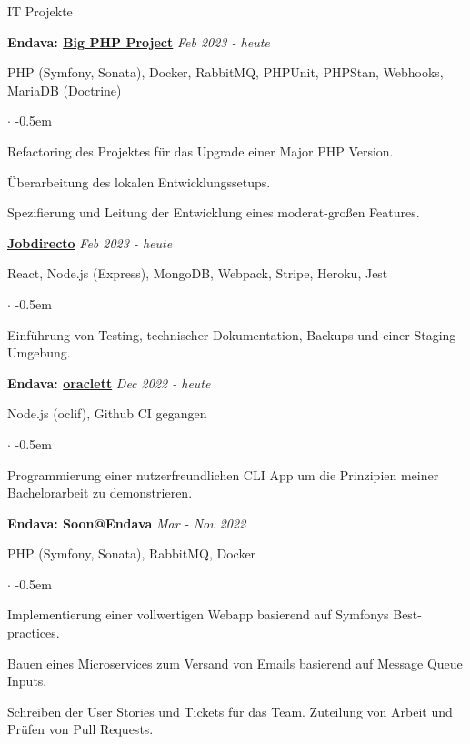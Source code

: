\documentclass{cv}
\begin{document}
\begin{rSection}{IT Projekte}



  \textbf{Endava: \href{https://tvthek.orf.at/}{Big PHP Project}}
  \hfill
  {\em Feb 2023 - heute}

  PHP (Symfony, Sonata), Docker, RabbitMQ, PHPUnit, PHPStan, Webhooks, MariaDB (Doctrine)
  \begin{list}{$\cdot$}{}
  \itemsep -0.5em \vspace{-0.5em}
    \smallskip
  \item Refactoring des Projektes für das Upgrade einer Major PHP Version.
  \item Überarbeitung des lokalen Entwicklungssetups.
  \item Spezifierung und Leitung der Entwicklung eines moderat-großen Features.
  \end{list}

  \textbf{\href{https://www.jobdirecto.com/}{Jobdirecto}}
  \hfill
  {\em Feb 2023 - heute}

  React, Node.js (Express), MongoDB, Webpack, Stripe, Heroku, Jest
  \begin{list}{$\cdot$}{}
  \itemsep -0.5em \vspace{-0.5em}
    \smallskip
  \item Einführung von Testing, technischer Dokumentation, Backups und einer Staging Umgebung.
  \end{list}

  \textbf{Endava: \href{https://github.com/jneidel/oraclett}{oraclett}}
  \hfill
  {\em Dec 2022 - heute}

  Node.js (oclif), Github CI
  gegangen  \begin{list}{$\cdot$}{}
  \itemsep -0.5em \vspace{-0.5em}
    \smallskip
  \item Programmierung einer nutzerfreundlichen CLI App um die Prinzipien meiner Bachelorarbeit zu demonstrieren.
  \end{list}

  \textbf{Endava: Soon@Endava}
  \hfill
  {\em Mar - Nov 2022}

  PHP (Symfony, Sonata), RabbitMQ, Docker
  \begin{list}{$\cdot$}{}
  \itemsep -0.5em \vspace{-0.5em}
    \smallskip
  \item Implementierung einer vollwertigen Webapp basierend auf Symfonys Best-practices.
  \item Bauen eines Microservices zum Versand von Emails basierend auf Message Queue Inputs.
  \item Schreiben der User Stories und Tickets für das Team. Zuteilung von Arbeit und Prüfen von Pull Requests.
  \end{list}


\end{rSection}
\end{document}
